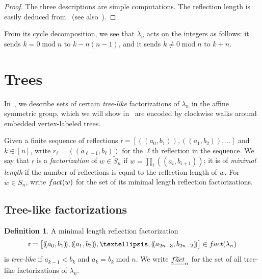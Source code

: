 \documentclass[a4paper,10pt,leqno]{amsart}
\newcommand{\darkred}{\color{darkred}}
\numberwithin{equation}{section}
\theoremstyle{definition}
\newtheorem{definition}[theorem]{Definition}
\theoremstyle{remark}
\newcommand{\Ft}{\textsc{f}\widetilde{\textsc{a}}\textsc{ct}}
\newcommand{\Fact}{\textsc{fact}}
\newcommand{\AS}{\widetilde{S}}
\newcommand{\EFt}{\underline{\Ft}}
\renewcommand{\mod}{\;\mathrm{mod}\;}
\newcommand{\rr}{\mathsf{r}}
\newcommand{\rrr}{r}
\newcommand{\defn}[1]{\emph{\darkred #1}}
\newcounter{intege}
\begin{document}
\begin{proof}
The three descriptions are simple computations.  The reflection length is easily deduced from~\cite[Proposition 4.3]{mccammond2011bounding} (see also~\cite[Theorem 4.25]{lewis2019computing}).%
\end{proof}

From its cycle decomposition, we see that $\lambda_n$ acts on the integers as follows: it sends $k=0\mod n$ to $k-n(n-1)$, and it sends $k \neq 0 \mod n$ to $k + n$.

\section{Trees}
\label{sec:factorizations}

In~, we describe sets of certain \emph{tree-like} factorizations of $\lambda_n$ in the affine symmetric group, which we will show in~ are encoded by clockwise walks around embedded vertex-labeled trees.

Given a finite sequence of reflections 
$\rr=\left[(\!(a_{0}, b_1)\!), (\!(a_{1}, b_2)\!),\ldots\right]$ and $k \in [n]$, write $\rrr_\ell=(\!(a_{\ell-1},b_\ell)\!)$ for the $\ell$th reflection in the sequence.  We say that $\rr$ is a \defn{factorization} of $w \in \AS_n$ if $w = \prod_{i} (\!(a_i,b_{i+1})\!)$; it is of \defn{minimal length} if the number of reflections is equal to the reflection length of $w$.  For $w \in \AS_n$, write $\Fact(w)$ for the set of its minimal length reflection factorizations.

\subsection{Tree-like factorizations}
\label{sec:treelike_factorizations}

\begin{definition}
\label{def:treelike_factorizations}
  A minimal length reflection factorization
  \[\rr =  \big[(\!(a_{0}, b_1)\!), (\!(a_{1}, b_2)\!),\ldots, (\!(a_{2n-3}, b_{2n-2})\!)\big] \in \Fact(\lambda_n)\]
  is \defn{tree-like} if $a_{k-1} < b_k$ and $a_k = b_k \mod n$.
  We write $\EFt_n$ for the set of all tree-like factorizations of $\lambda_n$.
\end{definition}
\end{document}

